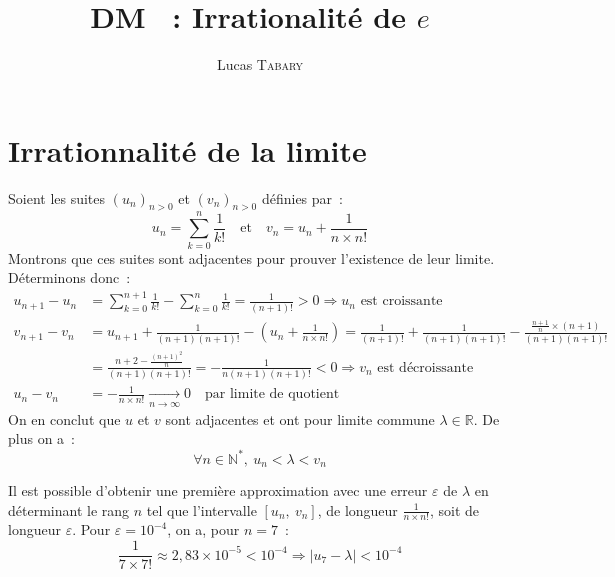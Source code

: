 \documentclass{article}
\title{\textbf{DM \No 8~: Irrationalité de $e$}}
\author{Lucas \textsc{Tabary}}
\date{}
\begin{document}
  \maketitle
  \hrulefill

  \vspace*{2cm}
  \hrulefill

  \section*{Irrationnalité de la limite}

  Soient les suites $\left(u_n\right)_{n>0}$ et $\left(v_n\right)_{n>0}$ définies par~:
  \begin{displaymath}
    u_n = \sum_{k=0}^n \frac{1}{k!} \quad\text{et}\quad v_n = u_n + \frac{1}{n\times n!}
  \end{displaymath}
  Montrons que ces suites sont adjacentes pour prouver l'existence de leur limite. Déterminons donc~:
  \begin{align*}
    u_{n+1} - u_n &= \sum_{k=0}^{n+1} \frac{1}{k!} - \sum_{k=0}^n \frac{1}{k!} = \frac{1}{(n + 1)!} > 0 \Longrightarrow \text{$u_n$ est croissante} \\
    v_{n + 1} - v_n &= u_{n + 1} + \frac{1}{(n + 1)(n + 1)!} - \left(u_n + \frac{1}{n\times n!}\right) =
    \frac{1}{(n + 1)!} + \frac{1}{(n + 1)(n + 1)!} - \frac{\frac{n + 1}{n}\times (n + 1)}{(n + 1)(n + 1)!} \\
    &= \frac{n + 2 - \frac{(n + 1)^2}{n}}{(n + 1)(n + 1)!} = - \frac{1}{n(n + 1)(n + 1)!} < 0 \Longrightarrow \text{$v_n$ est décroissante} \\
    u_n - v_n &= -\frac{1}{n\times n!} \underset{n\to\infty}{\longrightarrow} 0  \quad\text{par limite de quotient}
  \end{align*}
  On en conclut que $u$ et $v$ sont adjacentes et ont pour limite commune $\lambda\in\mathbb{R}$. De plus on a~:
  \begin{equation}\label{ADJACENTE}
    \forall n\in\mathbb{N}^*,\ u_n < \lambda < v_n
  \end{equation}

  Il est possible d'obtenir une première approximation avec une erreur $\varepsilon$ de $\lambda$ en déterminant le rang $n$ tel que l'intervalle $[u_n,\ v_n]$, de longueur $\frac{1}{n\times n!}$, soit de longueur $\varepsilon$. Pour $\varepsilon=10^{-4}$, on a, pour $n = 7$~:
  \begin{displaymath}
    \frac{1}{7 \times 7!} \approx 2,83\times 10^{-5} < 10^{-4} \Longrightarrow \vert u_7 - \lambda \vert < 10^{-4}
  \end{displaymath}
\end{document}
